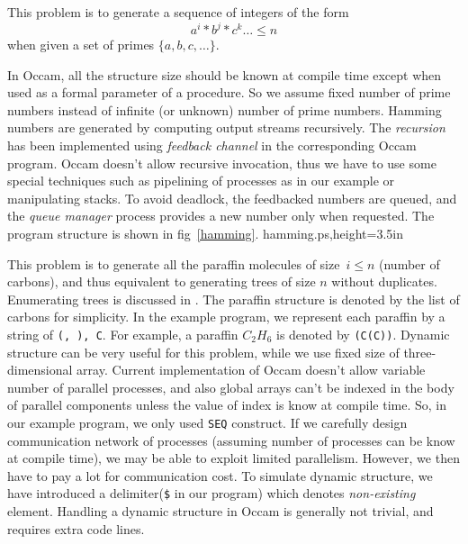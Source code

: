 
This problem is to generate a sequence of integers of the form 
\[
	a^{i}*b^{j}*c^{k}\ldots \leq n
\]
when given a set of primes $ \{a,b,c,\ldots\}$.

In Occam, all the structure size should be known at compile time
except when used as a formal parameter of a procedure.  So we assume
fixed number of prime numbers instead of infinite (or unknown) number
of prime numbers.  Hamming numbers are generated by computing output
streams recursively.  The {\em recursion} has been
implemented using {\em feedback channel} in the corresponding Occam 
program. Occam doesn't allow recursive invocation, thus we have to use
some special techniques such as pipelining of processes as in our
example
or manipulating stacks. \cite{Redf88}
To avoid deadlock, the feedbacked numbers are queued, and the {\em
queue manager} process
provides a new number only when requested.
The program structure is shown in fig~\ref{hamming}.
{hamming.ps,height=3.5in}
\begin{lin}

\end{lin}


This problem is to generate all the paraffin molecules of size\ $i \leq n$
(number of carbons), and thus equivalent to generating
trees of size $n$ without duplicates. Enumerating trees is
discussed in \cite{Knuth73}.
The paraffin structure is denoted by the list of
carbons for simplicity.  In the example program, we represent each
paraffin by a string of {\tt (, ), C}.  For example, a paraffin 
$C_{2}H_{6}$ is denoted by {\tt (C(C))}.  Dynamic structure can be very
useful for this problem, while we use fixed size of three-dimensional array.
Current implementation of Occam doesn't allow variable number of
parallel processes, and also global arrays can't be indexed in the body
of parallel components unless the 
value of index is know at compile time.  So, in our example program, we
only used {\tt SEQ} construct.  If we carefully design communication 
network of processes (assuming number of processes can be know at
compile time), we may be able to exploit limited parallelism.
However, we then have to pay a lot for communication cost.
To simulate dynamic structure, we have introduced a delimiter({\tt \$} in
our program) which denotes {\em non-existing} element.  Handling a dynamic
structure in Occam is generally not trivial, and requires extra code lines.
\begin{lin}

\end{lin}

